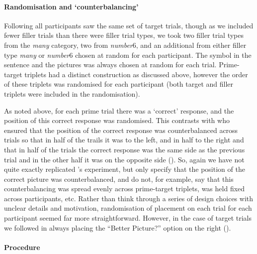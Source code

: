 \documentclass[10pt]{article}
\begin{document}
\begin{multicols}{2}
\paragraph{Randomisation and `counterbalancing'}

Following \citeauthor{Bott:2016aa} all participants saw the same set of target trials, though as we included fewer filler trials than there were filler trial types, we took two filler trial types from the \emph{many} category, two from \emph{number\(6\)}, and an additional from either filler type \emph{many} or \emph{number\(6\)} chosen at random for each participant.
The symbol in the sentence and the pictures was always chosen at random for each trial.
Prime-target triplets had a distinct construction as discussed above, however the order of these triplets was randomised for each participant (both target and filler triplets were included in the randomisation).

As noted above, for each prime trial there was a `correct' response, and the position of this correct response was randomised.
This contrasts with \citeauthor{Bott:2016aa} who ensured that the position of the correct response was counterbalanced across trials so that in half of the trails it was to the left, and in half to the right and that in half of the trials the correct response was the same side as the previous trial and in the other half it was on the opposite side (\citeyear[124]{Bott:2016aa}).
So, again we have not quite exactly replicated \citeauthor{Bott:2016aa}'s experiment, but \citeauthor{Bott:2016aa} only specify that the position of the correct picture was counterbalanced, and do not, for example, say that this counterbalancing was spread evenly across prime-target triplets, was held fixed across participants, etc.
Rather than think through a series of design choices with unclear details and motivation, randomisation of placement on each trial for each participant seemed far more straightforward.
However, in the case of target trials we followed \citeauthor{Bott:2016aa} in always placing the ``Better Picture?'' option on the right (\citeyear[124]{Bott:2016aa}).

\paragraph{Procedure}


\end{multicols}
\end{document}
